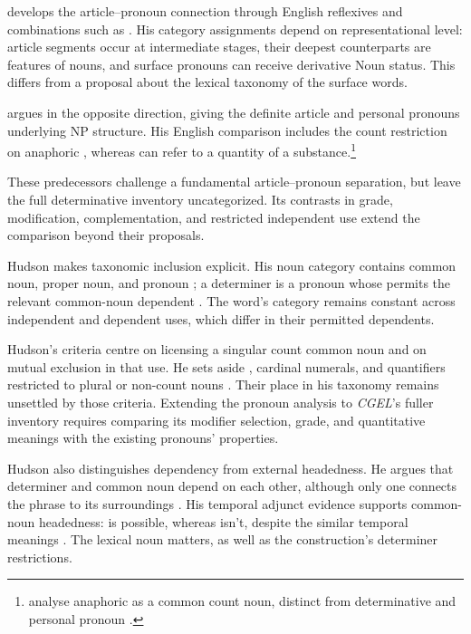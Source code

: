 \documentclass[12pt]{article}
\begin{document}
\textcite{postal1966} develops the article--pronoun connection through English reflexives and combinations such as . His category assignments depend on representational level: article segments occur at intermediate stages, their deepest counterparts are features of nouns, and surface pronouns can receive derivative Noun status. This differs from a proposal about the lexical taxonomy of the surface words.

\textcite[197--203]{sommerstein1972} argues in the opposite direction, giving the definite article and personal pronouns underlying NP structure. His English comparison includes the count restriction on anaphoric , whereas  can refer to a quantity of a substance.\footnote{\textcite[797--798]{payne2013anaphoric} analyse anaphoric  as a common count noun, distinct from determinative  and personal pronoun .}

These predecessors challenge a fundamental article--pronoun separation, but leave the full determinative inventory uncategorized. Its contrasts in grade, modification, complementation, and restricted independent use extend the comparison beyond their proposals.

Hudson makes taxonomic inclusion explicit. His noun category contains common noun, proper noun, and pronoun \citep[253--254]{hudson2010wordgrammar}; a determiner is a pronoun whose  permits the relevant common-noun dependent \citep[9--10]{hudson2004determiners}. The word's category remains constant across independent and dependent uses, which differ in their permitted dependents.

Hudson's criteria centre on licensing a singular count common noun and on mutual exclusion in that use. He sets aside , cardinal numerals, and quantifiers restricted to plural or non-count nouns \citep[9--10]{hudson2004determiners}. Their place in his taxonomy remains unsettled by those criteria. Extending the pronoun analysis to \textit{CGEL}'s fuller inventory requires comparing its modifier selection, grade, and quantitative meanings with the existing pronouns' properties.

Hudson also distinguishes dependency from external headedness. He argues that determiner and common noun depend on each other, although only one connects the phrase to its surroundings \citep[7--8]{hudson2004determiners}. His temporal adjunct evidence supports common-noun headedness:  is possible, whereas  isn't, despite the similar temporal meanings \citep[10--12]{hudson2004determiners}. The lexical noun matters, as well as the construction's determiner restrictions.
\end{document}
